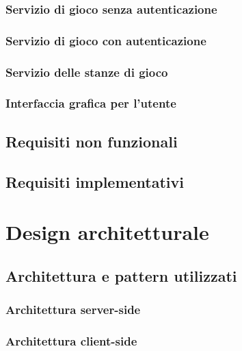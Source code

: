             \subsubsection[NoAutenticazion]{\large {Servizio di gioco senza autenticazione}\label{subsub:requirements:noauth}}
            \subsubsection[Autenticazion]{\large {Servizio di gioco con autenticazione}\label{subsub:requirements:auth}}
            \subsubsection[Stanze di gioco]{\large {Servizio delle stanze di gioco}\label{subsub:requirements:lobby}}
            \subsubsection[Interfaccia utente]{\large {Interfaccia grafica per l'utente}\label{subsub:requirements:gui}}
        \subsection {Requisiti non funzionali}\label{subsec:requirements:notFunctional}
        \subsection {Requisiti implementativi}\label{subsec:requirements:implementative}

   \clearpage

    \section{Design architetturale}\label{sec:design}
        \subsection[Architettura]{Architettura e pattern utilizzati}\label{subsec:architecture}
            \subsubsection{Architettura server-side}\label{subsub:architecture:server}
            \subsubsection{Architettura client-side}\label{subsub:architecture:client}

